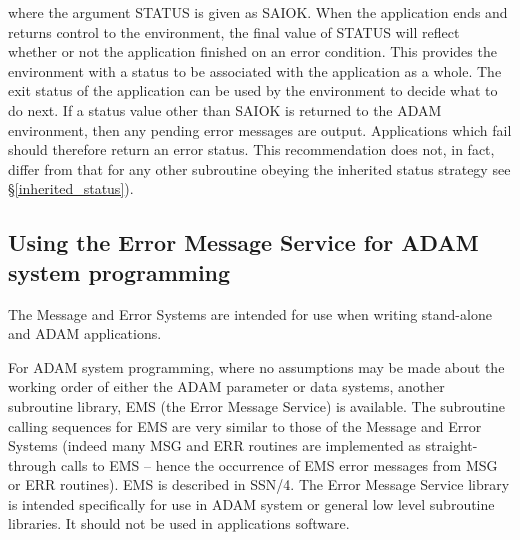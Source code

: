 \documentclass[twoside,11pt]{article}
\newcommand{\htmlref}[2]{#1}
\newcommand{\latex}[1]{#1}
\newcommand{\xref}[3]{#1}
\newcommand{\xlabel}[1]{}
\renewcommand{\_}{\texttt{\symbol{95}}}
\begin{document}
where the argument STATUS is given as SAI\_\_OK. 
When the application ends and returns control to the environment, the final
value of STATUS will reflect whether or not the application finished on an
error condition.
This provides the environment with a status to be associated with the
application as a whole. 
The exit status of the application can be used by the environment to decide
what to do next. 
If a status value other than SAI\_\_OK is returned to the ADAM environment,
then any pending error messages are output. 
Applications which fail should therefore return an error status.
This recommendation does not, in fact, differ from that for any other subroutine
obeying the
\htmlref
{inherited status strategy}{inherited_status}\latex{ see \S\ref{inherited_status})}.


\subsection{\xlabel{using_the_error_message_service_for_adam_system_programming}Using the Error Message Service for ADAM system programming}
The Message and Error Systems are intended for use when writing stand-alone and
ADAM applications. 

For ADAM system programming, where no
assumptions may be made about the working order of either the ADAM parameter 
or data systems,
another subroutine library, 
\xref{EMS}{ssn4}{abstract} (the Error Message Service)
is available.
The subroutine calling sequences for EMS are very similar to those of
the Message and Error Systems (indeed many MSG and ERR routines are implemented
as straight-through calls to EMS -- hence the occurrence of EMS error messages 
from MSG or ERR routines). 
\latex{EMS is described in SSN/4.}
The Error Message Service library is intended specifically for use in ADAM 
system or general low level subroutine libraries.
It should not be used in applications software.

\newpage
\end{document}
